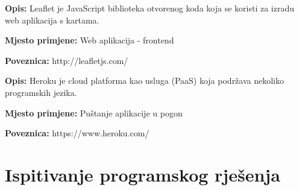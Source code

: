 			\noindent {}
			\begin{packed_item}
				\item  \textbf{Opis:} Leaflet je JavaScript biblioteka otvorenog koda koja se koristi za izradu web aplikacija s kartama.
				\item  \textbf{Mjesto primjene:} Web aplikacija - frontend
				\item  \textbf{Poveznica:} http://leafletjs.com/
			\end{packed_item}
		
			\noindent {}
			\begin{packed_item}
				\item  \textbf{Opis:} Heroku je cloud platforma kao usluga (PaaS) koja podržava nekoliko programskih jezika.
				\item  \textbf{Mjesto primjene:} Puštanje aplikacije u pogon
				\item  \textbf{Poveznica:} https://www.heroku.com/
			\end{packed_item}
			\eject 
		
	
		\section{Ispitivanje programskog rješenja}
			
